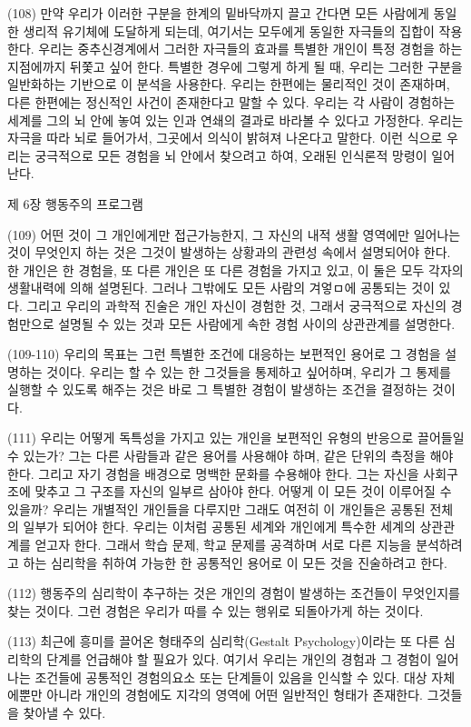 \documentclass[12pt, a4paper]{article}
\begin{document}
(108) 만약 우리가 이러한 구분을 한계의 밑바닥까지 끌고 간다면 모든 사람에게 동일한 생리적 유기체에 도달하게 되는데, 여기서는 모두에게 동일한 자극들의 집합이 작용한다. 우리는 중추신경계에서 그러한 자극들의 효과를 특별한 개인이 특정 경험을 하는 지점에까지 뒤쫓고 싶어 한다. 특별한 경우에 그렇게 하게 될 때, 우리는 그러한 구분을 일반화하는 기반으로 이 분석을 사용한다. 우리는 한편에는 물리적인 것이 존재하며, 다른 한편에는 정신적인 사건이 존재한다고 말할 수 있다. 우리는 각 사람이 경험하는 세계를 그의 뇌 안에 놓여 있는 인과 연쇄의 결과로 바라볼 수 있다고 가정한다. 우리는 자극을 따라 뇌로 들어가서, 그곳에서 의식이 밝혀져 나온다고 말한다. 이런 식으로 우리는 궁극적으로 모든 경험을 뇌 안에서 찾으려고 하여, 오래된 인식론적 망령이 일어난다.

제 6장 행동주의 프로그램

(109) 어떤 것이 그 개인에게만 접근가능한지, 그 자신의 내적 생활 영역에만 일어나는 것이 무엇인지 하는 것은 그것이 발생하는 상황과의 관련성 속에서 설명되어야 한다. 한 개인은 한 경험을, 또 다른 개인은 또 다른 경험을 가지고 있고, 이 둘은 모두 각자의 생활내력에 의해 설명된다. 그러나 그밖에도 모든 사람의 겨엏ㅁ에 공통되는 것이 있다. 그리고 우리의 과학적 진술은 개인 자신이 경험한 것, 그래서 궁극적으로 자신의 경험만으로 설명될 수 있는 것과 모든 사람에게 속한 경험 사이의 상관관계를 설명한다.

(109-110) 우리의 목표는 그런 특별한 조건에 대응하는 보편적인 용어로 그 경험을 설명하는 것이다. 우리는 할 수 있는 한 그것들을 통제하고 싶어하며, 우리가 그 통제를 실행할 수 있도록 해주는 것은 바로 그 특별한 경험이 발생하는 조건을 결정하는 것이다.

(111) 우리는 어떻게 독특성을 가지고 있는 개인을 보편적인 유형의 반응으로 끌어들일 수 있는가? 그는 다른 사람들과 같은 용어를 사용해야 하며, 같은 단위의 측정을 해야 한다. 그리고 자기 경험을 배경으로 명백한 문화를 수용해야 한다. 그는 자신을 사회구조에 맞추고 그 구조를 자신의 일부르 삼아야 한다. 어떻게 이 모든 것이 이루어질 수 있을까? 우리는 개별적인 개인들을 다루지만 그래도 여전히 이 개인들은 공통된 전체의 일부가 되어야 한다. 우리는 이처럼 공통된 세계와 개인에게 특수한 세계의 상관관계를 얻고자 한다. 그래서 학습 문제, 학교 문제를 공격하며 서로 다른 지능을 분석하려고 하는 심리학을 취하여 가능한 한 공통적인 용어로 이 모든 것을 진술하려고 한다.

(112) 행동주의 심리학이 추구하는 것은 개인의 경험이 발생하는 조건들이 무엇인지를 찾는 것이다. 그런 경험은 우리가 따를 수 있는 행위로 되돌아가게 하는 것이다.

(113) 최근에 흥미를 끌어온 형태주의 심리학(Gestalt Psychology)이라는 또 다른 심리학의 단계를 언급해야 할 필요가 있다. 여기서 우리는 개인의 경험과 그 경험이 일어나는 조건들에 공통적인 경험의요소 또는 단계들이 있음을 인식할 수 있다. 대상 자체에뿐만 아니라 개인의 경험에도 지각의 영역에 어떤 일반적인 형태가 존재한다. 그것들을 찾아낼 수 있다. 
\end{document}
